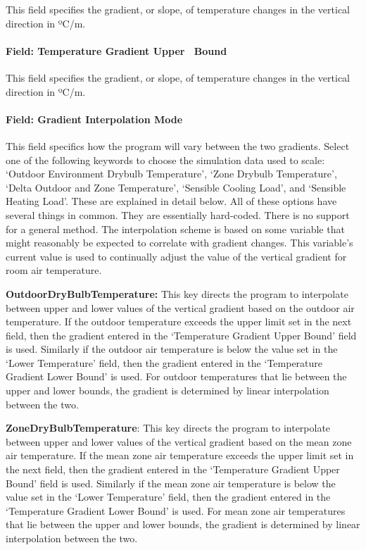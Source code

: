 This field specifies the gradient, or slope, of temperature changes in the vertical direction in ºC/m.

\paragraph{Field: Temperature Gradient Upper~ Bound}\label{field-temperature-gradient-upper-bound}

This field specifies the gradient, or slope, of temperature changes in the vertical direction in ºC/m.

\paragraph{Field: Gradient Interpolation Mode}\label{field-gradient-interpolation-mode}

This field specifics how the program will vary between the two gradients. Select one of the following keywords to choose the simulation data used to scale:~ `Outdoor Environment Drybulb Temperature', `Zone Drybulb Temperature', `Delta Outdoor and Zone Temperature', `Sensible Cooling Load', and `Sensible Heating Load'. These are explained in detail below. All of these options have several things in common. They are essentially hard-coded. There is no support for a general method. The interpolation scheme is based on some variable that might reasonably be expected to correlate with gradient changes. This variable's current value is used to continually adjust the value of the vertical gradient for room air temperature.

\textbf{OutdoorDryBulbTemperature:} This key directs the program to interpolate between upper and lower values of the vertical gradient based on the outdoor air temperature. If the outdoor temperature exceeds the upper limit set in the next field, then the gradient entered in the `Temperature Gradient Upper Bound' field is used. Similarly if the outdoor air temperature is below the value set in the `Lower Temperature' field, then the gradient entered in the `Temperature Gradient Lower Bound' is used. For outdoor temperatures that lie between the upper and lower bounds, the gradient is determined by linear interpolation between the two.

\textbf{ZoneDryBulbTemperature}: This key directs the program to interpolate between upper and lower values of the vertical gradient based on the mean zone air temperature. If the mean zone air temperature exceeds the upper limit set in the next field, then the gradient entered in the `Temperature Gradient Upper Bound' field is used. Similarly if the mean zone air temperature is below the value set in the `Lower Temperature' field, then the gradient entered in the `Temperature Gradient Lower Bound' is used. For mean zone air temperatures that lie between the upper and lower bounds, the gradient is determined by linear interpolation between the two.

